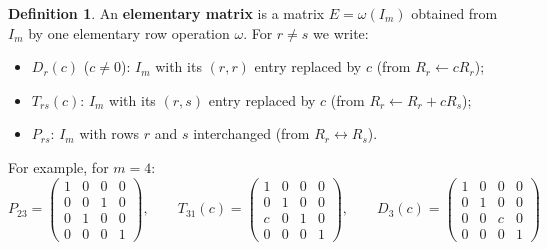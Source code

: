 \documentclass[12pt]{article}
\theoremstyle{definition}
\newtheorem{definition}[theorem]{Definition}
\begin{document}
\begin{definition}\label{r2-def-elementary}
An \textbf{elementary matrix} is a matrix \(E=\omega(I_m)\) obtained from \(I_m\) by one
elementary row operation \(\omega\). For \(r\ne s\) we write:
\begin{itemize}
\item \(D_r(c)\) (\(c\ne0\)): \(I_m\) with its \((r,r)\) entry replaced by \(c\)
(from \(R_r\leftarrow cR_r\));
\item \(T_{rs}(c)\): \(I_m\) with its \((r,s)\) entry replaced by \(c\)
(from \(R_r\leftarrow R_r+cR_s\));
\item \(P_{rs}\): \(I_m\) with rows \(r\) and \(s\) interchanged (from \(R_r\leftrightarrow R_s\)).
\end{itemize}
For example, for \(m=4\):
\[
P_{23}=\begin{pmatrix}1&0&0&0\\0&0&1&0\\0&1&0&0\\0&0&0&1\end{pmatrix},\qquad
T_{31}(c)=\begin{pmatrix}1&0&0&0\\0&1&0&0\\c&0&1&0\\0&0&0&1\end{pmatrix},\qquad
D_3(c)=\begin{pmatrix}1&0&0&0\\0&1&0&0\\0&0&c&0\\0&0&0&1\end{pmatrix}
\]
\end{definition}
\end{document}
